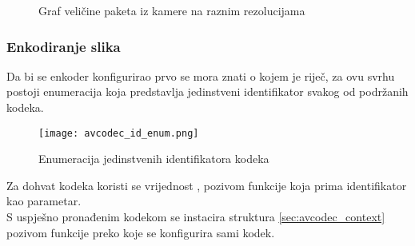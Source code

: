 \begin{figure}[H]
  \centering
  \caption{Graf veličine  paketa iz kamere na raznim rezolucijama} 
  \label{pic:packet_size}
\end{figure}

\subsubsection{Enkodiranje slika} \label{sec:encoding}
Da bi se enkoder konfigurirao prvo se mora znati o kojem je riječ, za ovu svrhu postoji enumeracija  \cite{ffmpegDocs}
koja predstavlja jedinstveni identifikator svakog od podržanih kodeka.
\begin{figure}[h]
  \centering
  \texttt{[image: avcodec\_id\_enum.png]}
  \caption{\small Enumeracija jedinstvenih identifikatora kodeka}
\end{figure}
\paraBreak
Za dohvat  kodeka koristi se vrijednost , pozivom funkcije 
koja prima identifikator kao parametar. \\
S uspješno pronađenim kodekom se instacira struktura  \ref{sec:avcodec_context} pozivom funkcije
 preko koje se konfigurira sami kodek.

